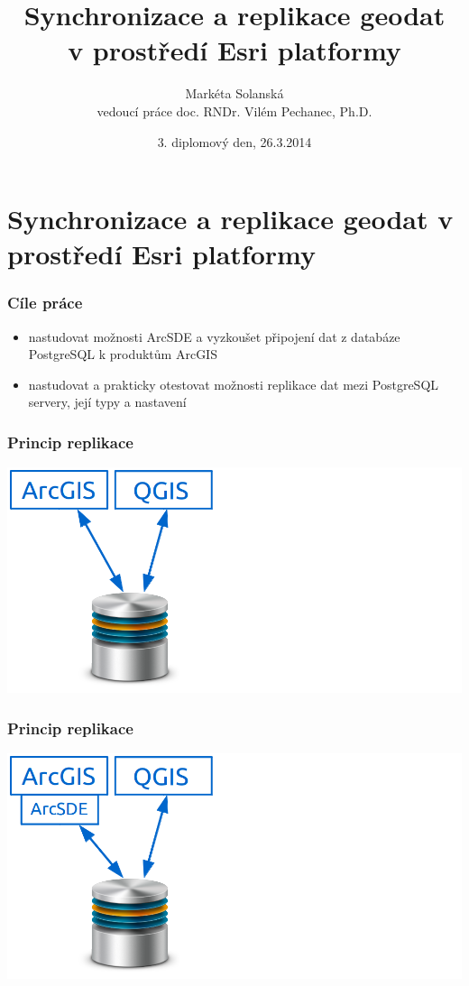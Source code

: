 \documentclass[xcolor=dvipsnames, 14pt]{beamer}
\begin{document}
\title[Synchronizace a replikace geodat]{Synchronizace a replikace geodat \\v prostředí Esri platformy}
\author[M. Solanská]{Markéta Solanská \\vedoucí práce doc. RNDr. Vilém Pechanec, Ph.D.}
\date[6.3.2013]{3. diplomový den, 26.3.2014}


\begin{frame}
  \titlepage
\end{frame}

\section{Synchronizace a replikace geodat v prostředí Esri platformy}

  \begin{frame}
    \frametitle{Cíle práce}
    \begin{itemize}
        \item nastudovat možnosti ArcSDE a vyzkoušet připojení dat z databáze PostgreSQL k produktům ArcGIS
        \item nastudovat a prakticky otestovat možnosti replikace dat mezi PostgreSQL servery, její typy a nastavení
    \end{itemize}
  \end{frame}
  
  \begin{frame}
    \frametitle{Princip replikace}
    \centering
    \includegraphics[scale=0.45]{obr/schema1.png} 
  \end{frame}

  \begin{frame}
    \frametitle{Princip replikace}
    \centering
    \includegraphics[scale=0.45]{obr/schema1-sde.png} 
  \end{frame}
\end{document}
